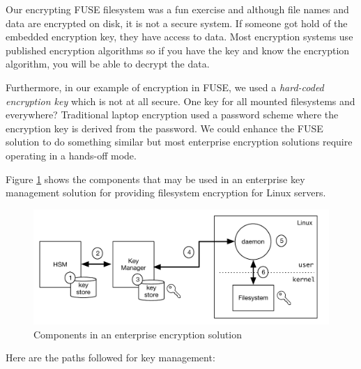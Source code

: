 Our encrypting FUSE filesystem was a fun exercise and although file names and data are encrypted on disk, it is not a secure system. If someone got hold of the embedded encryption key, they have access to data. Most encryption systems use published encryption algorithms so if you have the key and know the encryption algorithm, you will be able to decrypt the data.

Furthermore, in our example of encryption in FUSE, we used a \textit{hard-coded encryption key} which is not at all secure. One key for all mounted filesystems and everywhere? Traditional laptop encryption used a password scheme where the encryption key is derived from the password. We could enhance the FUSE solution to do something similar but most enterprise encryption solutions require operating in a hands-off mode.

Figure \ref{fig:key-mgt} shows the components that may be used in an enterprise key management solution for providing filesystem encryption for Linux servers.

\begin{figure}
	\includegraphics[scale=0.6]{figures/key-mgt.pdf}
	\centering
	\caption{Components in an enterprise encryption solution}
	\label{fig:key-mgt}
\end{figure}

\noindent
Here are the paths followed for key management:

